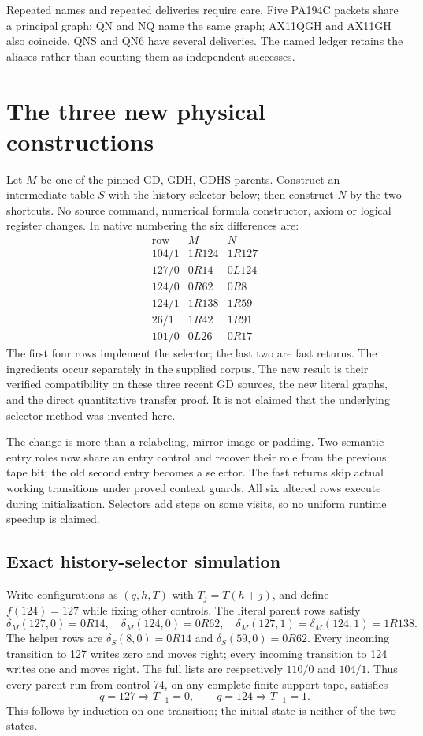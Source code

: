 \documentclass[11pt,letterpaper]{article}
\begin{document}
Repeated names and repeated deliveries require care. Five PA194C packets
share a principal graph; QN and NQ name the same graph; AX11QGH and AX11GH
also coincide. QNS and QN6 have several deliveries. The named ledger
retains the aliases rather than counting them as independent successes.

\section{The three new physical constructions}
\label{sec:construction}

Let $M$ be one of the pinned GD, GDH, GDHS parents. Construct an intermediate
table $S$ with the history selector below; then construct $N$ by the two
shortcuts. No source command, numerical formula constructor, axiom or
logical register changes. In native numbering the six differences are:
\[
\begin{array}{c|c|c}
\text{row}&M&N\\\hline
104/1&1R124&1R127\\
127/0&0R14&0L124\\
124/0&0R62&0R8\\
124/1&1R138&1R59\\
26/1&1R42&1R91\\
101/0&0L26&0R17
\end{array}
\]
The first four rows implement the selector; the last two are fast returns.
The ingredients occur separately in the supplied corpus. The new result
is their verified compatibility on these three recent GD sources, the
new literal graphs, and the direct quantitative transfer proof. It is
not claimed that the underlying selector method was invented here.

The change is more than a relabeling, mirror image or padding. Two semantic
entry roles now share an entry control and recover their role from the
previous tape bit; the old second entry becomes a selector. The fast
returns skip actual working transitions under proved context guards.
All six altered rows execute during initialization. Selectors add steps
on some visits, so no uniform runtime speedup is claimed.

\subsection{Exact history-selector simulation}

Write configurations as $(q,h,T)$ with $T_j=T(h+j)$, and define
$f(124)=127$ while fixing other controls. The literal parent rows satisfy
\[
\delta_M(127,0)=0R14,\quad\delta_M(124,0)=0R62,\quad
\delta_M(127,1)=\delta_M(124,1)=1R138.
\]
The helper rows are $\delta_S(8,0)=0R14$ and
$\delta_S(59,0)=0R62$. Every incoming transition to 127 writes zero
and moves right; every incoming transition to 124 writes one and moves
right. The full lists are respectively $110/0$ and $104/1$.
Thus every parent run from control 74, on any complete finite-support
tape, satisfies
\[
 q=127\Rightarrow T_{-1}=0,\qquad
 q=124\Rightarrow T_{-1}=1.                 \tag{E}
\]
This follows by induction on one transition; the initial state is neither
of the two states.
\end{document}
